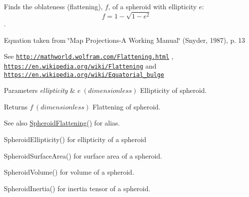 Finds the oblateness (flattening), $f$, of a spheroid with ellipticity $e$\+: \[ f = 1 - \sqrt{1-e^2} \]. 

Equation taken from \char`\"{}\+Map Projections-\/\+A Working Manual\char`\"{} (Snyder, 1987), p. 13

See \href{http://mathworld.wolfram.com/Flattening.html}{\tt http\+://mathworld.\+wolfram.\+com/\+Flattening.\+html} , \href{https://en.wikipedia.org/wiki/Flattening}{\tt https\+://en.\+wikipedia.\+org/wiki/\+Flattening} and \href{https://en.wikipedia.org/wiki/Equatorial_bulge}{\tt https\+://en.\+wikipedia.\+org/wiki/\+Equatorial\+\_\+bulge} 
\begin{DoxyParams}{Parameters}
{\em ellipticity} & $ e\ (dimensionless)$ Ellipticity of spheroid. \\
\hline
\end{DoxyParams}
\begin{DoxyReturn}{Returns}
$ f\ (dimensionless)$ Flattening of spheroid. 
\end{DoxyReturn}
\begin{DoxySeeAlso}{See also}
\mbox{\hyperlink{group___e_g_x_math-_geometry-3_d-_spheroid-_flattening_gacd0d1ae60af3a7f1a09ed2f65636c132}{Spheroid\+Flattening()}} for alias. 

Spheroid\+Ellipticity() for ellipticity of a spheroid 

Spheroid\+Surface\+Area() for surface area of a spheroid. 

Spheroid\+Volume() for volume of a spheroid. 

Spheroid\+Inertia() for inertia tensor of a spheroid. 
\end{DoxySeeAlso}
